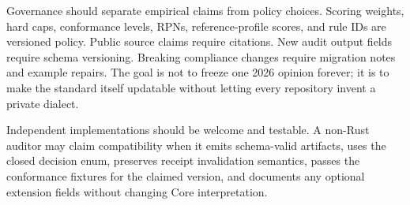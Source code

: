 Governance should separate empirical claims from policy choices. Scoring weights, hard caps, conformance levels, RPNs, reference-profile scores, and rule IDs are versioned policy. Public source claims require citations. New audit output fields require schema versioning. Breaking compliance changes require migration notes and example repairs. The goal is not to freeze one 2026 opinion forever; it is to make the standard itself updatable without letting every repository invent a private dialect.

Independent implementations should be welcome and testable. A non-Rust auditor may claim compatibility when it emits schema-valid artifacts, uses the closed decision enum, preserves receipt invalidation semantics, passes the conformance fixtures for the claimed version, and documents any optional extension fields without changing Core interpretation.
